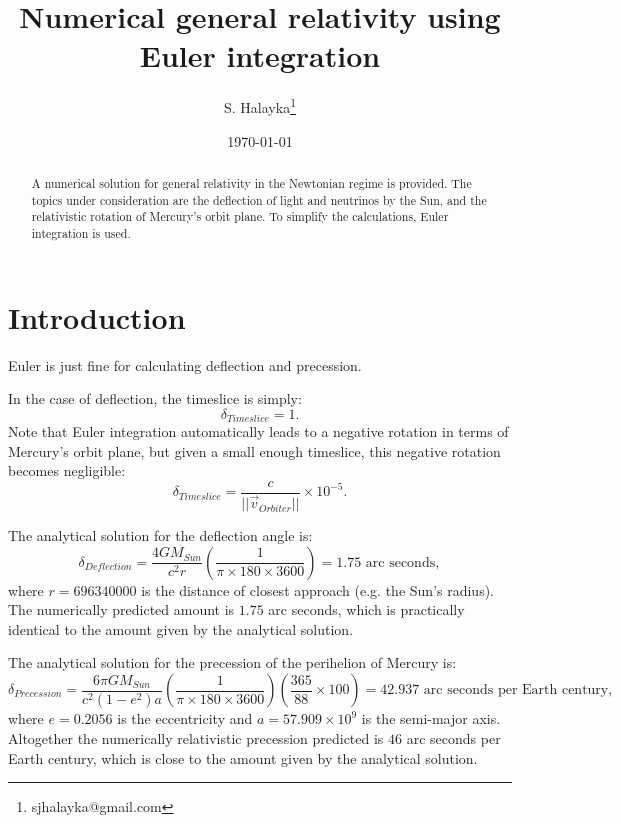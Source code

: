 \documentclass[12pt]{article}
\title{Numerical general relativity using Euler integration}
\author{S. Halayka\footnote{sjhalayka@gmail.com}}
\date{\today\;\currenttime}
\begin{document}
 
\maketitle

\begin{abstract}
A numerical solution for general relativity in the Newtonian regime is provided.
The topics under consideration are the deflection of light and neutrinos by the Sun, and the relativistic rotation of Mercury's orbit plane.
To simplify the calculations, Euler integration is used.
\end{abstract}





\section{Introduction}



Euler is just fine for calculating deflection and precession.

In the case of deflection, the timeslice is simply:
\begin{equation}
\delta_{Timeslice} = 1.
\end{equation}
Note that Euler integration automatically leads to a negative rotation in terms of Mercury's orbit plane, but given a small enough timeslice, this negative rotation becomes negligible:
\begin{equation}
\delta_{Timeslice} = \frac{c}{\lvert\lvert \vec{v}_{Orbiter} \rvert \rvert} \times 10^{-5}.
\end{equation}


The analytical solution for the deflection angle is:
\begin{equation}
\delta_{Deflection} = \frac{4GM_{Sun}}{c^2 r} \left( \frac{1}{\pi \times 180 \times 3600} \right) = 1.75 \textrm{ arc seconds},
\end{equation}
where $r = 696340000$ is the distance of closest approach (e.g. the Sun's radius).
The numerically predicted amount is $1.75$ arc seconds, which is practically identical to the amount given by the analytical solution.

The analytical solution for the precession of the perihelion of Mercury is:
\begin{equation}
\delta_{Precession} = \frac{6 \pi GM_{Sun}}{c^2 (1 - e^2) a} \left( \frac{1}{ \pi \times 180 \times 3600} \right) \left( \frac{365}{88} \times 100 \right) = 42.937 \textrm{ arc seconds per Earth century},
\end{equation}
where $e = 0.2056$ is the eccentricity and $a = 57.909 \times 10^9$ is the semi-major axis.
Altogether the numerically relativistic precession predicted is $46$ arc seconds per Earth century, which is close to the amount given by the analytical solution.
\end{document}
